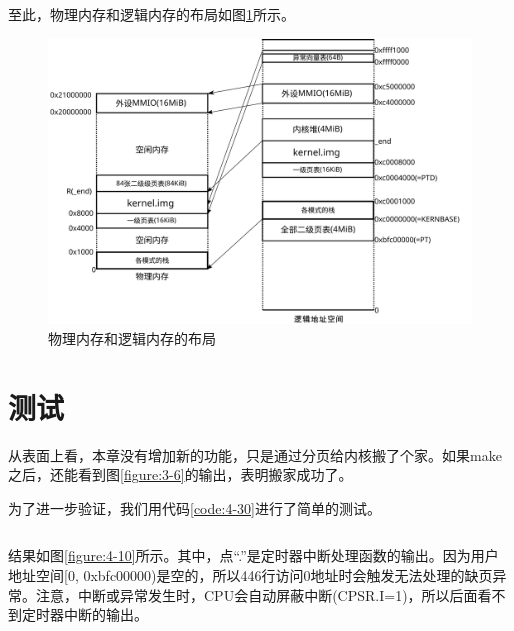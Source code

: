 \documentclass[main.tex]{subfiles}
\begin{document}
\begin{CJK*}{UTF8}{song}
\begin{code}
\label{code:4-29}
\inputminted[firstline=398,lastline=410,linenos,numbersep=5pt,frame=lines,framesep=2mm]{c}{src/chapter04/kernel/machdep.c}
\end{code}

至此，物理内存和逻辑内存的布局如图\ref{figure:4-9}所示。

\begin{figure}[htp]
\centering
\includegraphics[scale=0.4]{figures/4-9}
\caption{物理内存和逻辑内存的布局}
\label{figure:4-9}
\end{figure}

\section{测试}
从表面上看，本章没有增加新的功能，只是通过分页给内核搬了个家。如果make之后，还能看到图\ref{figure:3-6}的输出，表明搬家成功了。

\par
为了进一步验证，我们用代码\ref{code:4-30}进行了简单的测试。

\begin{code}
\label{code:4-30}
\inputminted[firstline=438,lastline=447,linenos,numbersep=5pt,frame=lines,framesep=2mm]{c}{src/chapter04/kernel/machdep.c}
\end{code}

结果如图\ref{figure:4-10}所示。其中，点“.”是定时器中断处理函数的输出。因为用户地址空间[0, 0xbfc00000)是空的，所以446行访问0地址时会触发无法处理的缺页异常。注意，中断或异常发生时，CPU会自动屏蔽中断(CPSR.I=1)，所以后面看不到定时器中断的输出。


\end{CJK*}
\end{document}
